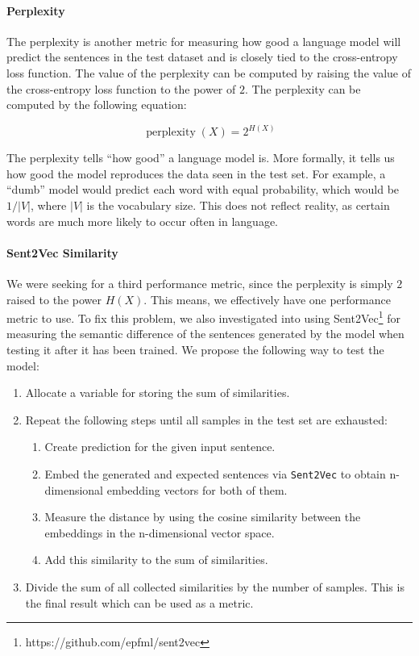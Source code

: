 \paragraph{Perplexity} The perplexity is another metric for measuring how good a language model will predict the sentences in the test dataset and is closely tied to the cross-entropy loss function. The value of the perplexity can be computed by raising the value of the cross-entropy loss function to the power of $2$. The perplexity can be computed by the following equation:

\begin{equation}
\operatorname{perplexity}(X) = 2^{H(X)}
\end{equation}

The perplexity tells ``how good'' a language model is. More formally, it tells us how good the model reproduces the data seen in the test set. For example, a ``dumb'' model would predict each word with equal probability, which would be $1/|V|$, where $|V|$ is the vocabulary size. This does not reflect reality, as certain words are much more likely to occur often in language.

\paragraph{Sent2Vec Similarity}\label{fundamentals:sent2vec_test} We were seeking for a third performance metric, since the perplexity is simply $2$ raised to the power $H(X)$. This means, we effectively have one performance metric to use. To fix this problem, we also investigated into using Sent2Vec\footnote{https://github.com/epfml/sent2vec} \cite{Pgj:2017} for measuring the semantic difference of the sentences generated by the model when testing it after it has been trained. We propose the following way to test the model:

\begin{enumerate}[noitemsep]
	\item Allocate a variable for storing the sum of similarities.
	\item Repeat the following steps until all samples in the test set are exhausted:
	\begin{enumerate}[noitemsep]
		\item Create prediction for the given input sentence.
		\item Embed the generated and expected sentences via \texttt{Sent2Vec} to obtain n-dimensional embedding vectors for both of them.
		\item Measure the distance by using the cosine similarity between the embeddings in the n-dimensional vector space.
		\item Add this similarity to the sum of similarities.
	\end{enumerate}
	\item Divide the sum of all collected similarities by the number of samples. This is the final result which can be used as a metric.
\end{enumerate}

